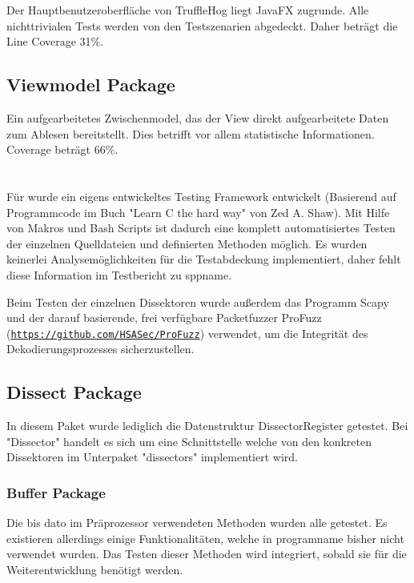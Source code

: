 Der Hauptbenutzeroberfläche von TruffleHog liegt JavaFX zugrunde. Alle nichttrivialen Tests werden von den Testszenarien abgedeckt. Daher beträgt die Line Coverage 31\%.

\subsection{Viewmodel Package}

Ein aufgearbeitetes Zwischenmodel, das der View direkt aufgearbeitete Daten zum Ablesen bereitstellt. Dies betrifft vor allem statistische Informationen. Coverage beträgt 66\%.

\section{\sppname}
Für \sppname wurde ein eigens entwickeltes Testing Framework entwickelt (Basierend auf Programmcode im Buch "{}Learn C the hard way"{} von Zed A. Shaw). Mit Hilfe von Makros und Bash Scripts ist dadurch eine komplett automatisiertes Testen der einzelnen Quelldateien und definierten Methoden möglich. Es wurden keinerlei Analysemöglichkeiten für die Testabdeckung implementiert, daher fehlt diese Information im Testbericht zu \gls{sppname}.

Beim Testen der einzelnen Dissektoren wurde außerdem das Programm Scapy und der darauf basierende, frei verfügbare Packetfuzzer ProFuzz \newline (\hyperlink{https://github.com/HSASec/ProFuzz}{\texttt{https://github.com/HSASec/ProFuzz}}) verwendet, um die Integrität des Dekodierungsprozesses sicherzustellen.

	\subsection{Dissect Package}
	In diesem Paket wurde lediglich die Datenstruktur DissectorRegister getestet. Bei "{}Dissector"{} handelt es sich um eine Schnittstelle welche von den konkreten Dissektoren im Unterpaket "{}dissectors"{} implementiert wird.
	
		\subsubsection{Buffer Package}
		Die bis dato im Präprozessor verwendeten Methoden wurden alle getestet. Es existieren allerdings einige Funktionalitäten, welche in \gls{programname} bisher nicht verwendet wurden. Das Testen dieser Methoden wird integriert, sobald sie für die Weiterentwicklung benötigt werden.
		
